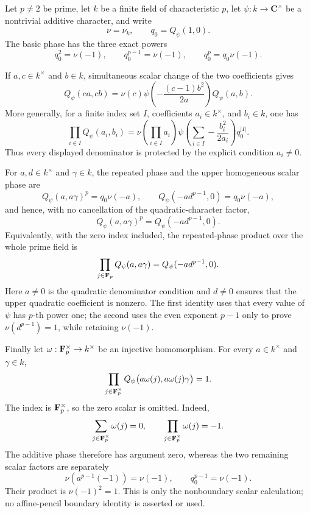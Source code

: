 \begin{theorem}\label{mod:cases-wildodd-scalarphaseproducts}
Let $p\ne2$ be prime, let $k$ be a finite field of characteristic
$p$, let $\psi:k\to\mathbf C^\times$ be a nontrivial additive
character, and write
\[
 \nu=\nu_k,\qquad q_0=Q_\psi(1,0).
\]
The basic phase has the three exact powers
\[
 q_0^2=\nu(-1),\qquad
 q_0^{p-1}=\nu(-1),\qquad
 q_0^p=q_0\nu(-1).
\]

If $a,c\in k^\times$ and $b\in k$, simultaneous scalar change of the
two coefficients gives
\[
 Q_\psi(ca,cb)
 =\nu(c)\psi\!\left(-\frac{(c-1)b^2}{2a}\right)Q_\psi(a,b).
\]
More generally, for a finite index set $I$, coefficients
$a_i\in k^\times$, and $b_i\in k$, one has
\[
 \prod_{i\in I}Q_\psi(a_i,b_i)
 =\nu\!\left(\prod_{i\in I}a_i\right)
  \psi\!\left(\sum_{i\in I}-\frac{b_i^2}{2a_i}\right)
  q_0^{|I|}.
\]
Thus every displayed denominator is protected by the explicit condition
$a_i\ne0$.

For $a,d\in k^\times$ and $\gamma\in k$, the repeated phase and the
upper homogeneous scalar phase are
\[
 Q_\psi(a,a\gamma)^p=q_0\nu(-a),
 \qquad
 Q_\psi(-a d^{p-1},0)=q_0\nu(-a),
\]
and hence, with no cancellation of the quadratic-character factor,
\[
 Q_\psi(a,a\gamma)^p=Q_\psi(-a d^{p-1},0).
\]
Equivalently, with the zero index included, the repeated-phase product
over the whole prime field is
\[
 \prod_{j\in\mathbf F_p}Q_\psi(a,a\gamma)
 =Q_\psi(-a d^{p-1},0).
\]
Here $a\ne0$ is the quadratic denominator condition and $d\ne0$
ensures that the upper quadratic coefficient is nonzero.  The first
identity uses that every value of $\psi$ has $p$-th power one; the
second uses the even exponent $p-1$ only to prove
$\nu(d^{p-1})=1$, while retaining $\nu(-1)$.

Finally let
$\omega:\mathbf F_p^\times\to k^\times$ be an injective homomorphism.  For
every $a\in k^\times$ and $\gamma\in k$,
\[
 \prod_{j\in\mathbf F_p^\times}
 Q_\psi\bigl(a\omega(j),a\omega(j)\gamma\bigr)=1.
\]
The index is $\mathbf F_p^\times$, so the zero scalar is omitted.  Indeed,
\[
 \sum_{j\in\mathbf F_p^\times}\omega(j)=0,
 \qquad
 \prod_{j\in\mathbf F_p^\times}\omega(j)=-1.
\]
The additive phase therefore has argument zero, whereas the two
remaining scalar factors are separately
\[
 \nu\!\left(a^{p-1}(-1)\right)=\nu(-1),
 \qquad q_0^{p-1}=\nu(-1).
\]
Their product is $\nu(-1)^2=1$.  This is only the nonboundary scalar
calculation; no affine-pencil boundary identity is asserted or used.
\leanok
{}
\FormalizationContract
\end{theorem}
